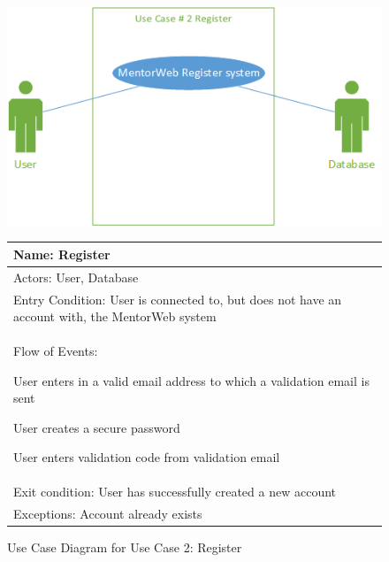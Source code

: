 \documentclass[11pt]{article}
\begin{document}
            \begin{figure}[H]
            \centering
            \includegraphics{UseCase2Register}

				\begin{tabular}{|p{12 cm}|}
					\hline
					Name: Register \\ \hline
					Actors: User, Database \\ \hline
					Entry Condition: User is connected to, but does not have an
					account with, the MentorWeb system\\ \hline
					Flow of Events:
					\begin{enumerate*}
						\item User enters in a valid email address to which a
						validation email is sent
						\item User creates a secure password
						\item User enters validation code from validation email
					\end{enumerate*} \\ \hline
					Exit condition: User has successfully created a new account
					\\ \hline
					Exceptions: Account already exists \\ \hline
				\end{tabular}

            \caption{Use Case Diagram for Use Case 2: Register}
            \label{UC2}
            \end{figure}
\end{document}

